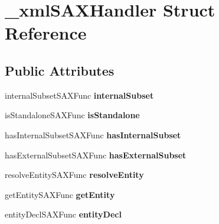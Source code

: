 \hypertarget{struct__xml_s_a_x_handler}{}\section{\+\_\+xml\+S\+A\+X\+Handler Struct Reference}
\label{struct__xml_s_a_x_handler}
\subsection*{Public Attributes}
\begin{DoxyCompactItemize}
\item 
\mbox{\label{struct__xml_s_a_x_handler_a7efae3be1f8af0e90820427744c26f48}} 
internal\+Subset\+S\+A\+X\+Func {\bfseries internal\+Subset}
\item 
\mbox{\label{struct__xml_s_a_x_handler_aa5ee8d4a02fd4bde74c3be5dbfdf608e}} 
is\+Standalone\+S\+A\+X\+Func {\bfseries is\+Standalone}
\item 
\mbox{\label{struct__xml_s_a_x_handler_ab28d186ce3e3876ab981cc3b911f616b}} 
has\+Internal\+Subset\+S\+A\+X\+Func {\bfseries has\+Internal\+Subset}
\item 
\mbox{\label{struct__xml_s_a_x_handler_a1a787a6a8c16f1229fe4efd525e93679}} 
has\+External\+Subset\+S\+A\+X\+Func {\bfseries has\+External\+Subset}
\item 
\mbox{\label{struct__xml_s_a_x_handler_ac50c24e61236da8bae7730b8185208b8}} 
resolve\+Entity\+S\+A\+X\+Func {\bfseries resolve\+Entity}
\item 
\mbox{\label{struct__xml_s_a_x_handler_a2e52dd17ed7ee2bc5e85362759dc2cfa}} 
get\+Entity\+S\+A\+X\+Func {\bfseries get\+Entity}
\item 
\mbox{\label{struct__xml_s_a_x_handler_ae7be01c36f39914f1ce8373b02670ea3}} 
entity\+Decl\+S\+A\+X\+Func {\bfseries entity\+Decl}
\item 
\mbox{\label{struct__xml_s_a_x_handler_ab41d080edc929fc5e39fee869ae46837}} 

\end{DoxyCompactItemize}
